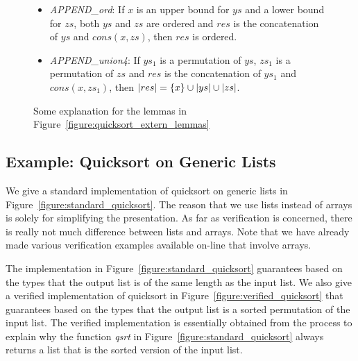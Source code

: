 \documentclass{llncs}
\begin{document}
\begin{figure}[thp]
\begin{itemize}
\item{\it APPEND\_ord}: If $x$ is an upper bound for $ys$ and a lower bound
for $zs$, both $ys$ and $zs$ are ordered and $res$ is the concatenation
of $ys$ and $cons(x, zs)$, then $res$ is ordered.
\item{\it APPEND\_union4}:
If $ys_1$ is a permutation of $ys$, $zs_1$ is a permutation of $zs$ and
$res$ is the concatenation of $ys_1$ and $cons (x, zs_1)$, then
$|res|=\{x\}\cup|ys|\cup|zs|$.
\end{itemize}
\caption{Some explanation for the lemmas in Figure~\ref{figure:quicksort_extern_lemmas}}
\label{figure:explanation_for_quicksort_extern_lemmas}
\end{figure}
\subsection{Example: Quicksort on Generic Lists}
We give a standard implementation of quicksort on generic lists in
Figure~\ref{figure:standard_quicksort}. The reason that we use lists
instead of arrays is solely for simplifying the presentation. As far as
verification is concerned, there is really not much difference between
lists and arrays. Note that we have already made various verification
examples available on-line that involve arrays.

The implementation in Figure~\ref{figure:standard_quicksort} guarantees
based on the types that the output list is of the same length as the input
list. We also give a verified implementation of quicksort in
Figure~\ref{figure:verified_quicksort} that guarantees based on the types
that the output list is a sorted permutation of the input list. The
verified implementation is essentially obtained from the process to explain
why the function {\it qsrt} in Figure~\ref{figure:standard_quicksort}
always returns a list that is the sorted version of the input list.
\end{document}
